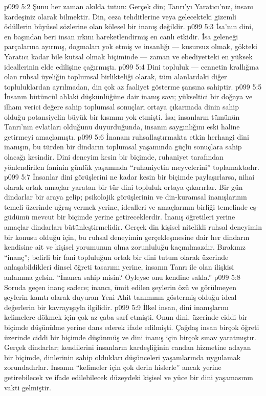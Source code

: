 \vs p099 5:2 Şunu her zaman akılda tutun: Gerçek din; Tanrı’yı Yaratıcı’nız, insanı kardeşiniz olarak bilmektir. Din, ceza tehditlerine veya gelecekteki gizemli ödüllerin büyüsel sözlerine olan kölesel bir inanış değildir.
\vs p099 5:3 İsa’nın dini, en başından beri insan ırkını hareketlendirmiş en canlı etkidir. İsa geleneği parçalarına ayırmış, dogmaları yok etmiş ve insanlığı --- kusursuz olmak, gökteki Yaratıcı kadar bile kutsal olmak biçiminde --- zaman ve ebediyetteki en yüksek ideallerinin elde edilişine çağırmıştı.
\vs p099 5:4 Dini topluluk --- cennetin krallığına olan ruhsal üyeliğin toplumsal birlikteliği olarak, tüm alanlardaki diğer topluluklardan ayrılmadan, din çok az faaliyet gösterme şansına sahiptir.
\vs p099 5:5 İnsanın bütüncül ahlaki düşkünlüğüne dair inanış savı; yükseltici bir doğaya ve ilham verici değere sahip toplumsal sonuçları ortaya çıkarmada dinin sahip olduğu potansiyelin büyük bir kısmını yok etmişti. İsa; insanların tümünün Tanrı’nın evlatları olduğunu duyurduğunda, insanın saygınlığını eski haline getirmeyi amaçlamıştı.
\vs p099 5:6 İnananı ruhsallaştırmakta etkin herhangi dini inanışın, bu türden bir dindarın toplumsal yaşamında güçlü sonuçlara sahip olacağı kesindir. Dini deneyim kesin bir biçimde, ruhaniyet tarafından yönlendirilen faninin günlük yaşamında “ruhaniyetin meyvelerini” toplamaktadır.
\vs p099 5:7 İnsanlar dini görüşlerini ne kadar kesin bir biçimde paylaşırlarsa, nihai olarak ortak amaçlar yaratan bir tür dini topluluk ortaya çıkarırlar. Bir gün dindarlar bir araya gelip; psikolojik görüşlerinin ve din\hyp{}kuramsal inanışlarının temeli üzerinde uğraş vermek yerine, idealleri ve amaçlarının birliği temelinde eş\hyp{}güdümü mevcut bir biçimde yerine getireceklerdir. İnanış öğretileri yerine amaçlar dindarları bütünleştirmelidir. Gerçek din kişisel nitelikli ruhsal deneyimin bir konusu olduğu için, bu ruhsal deneyimin gerçekleşmesine dair her dindarın kendisine ait ve kişisel yorumunun olma zorunluluğu kaçınılmazdır. Bırakınız “inanç”; belirli bir fani topluluğun ortak bir dini tutum olarak üzerinde anlaşabildikleri dinsel öğreti tasarımı yerine, insanın Tanrı ile olan ilişkisi anlamına gelsin. “İnanca sahip misin? Öyleyse onu kendine sakla.”
\vs p099 5:8 Soruda geçen inanç sadece; inancı, ümit edilen şeylerin özü ve görülmeyen şeylerin kanıtı olarak duyuran Yeni Ahit tanımının göstermiş olduğu ideal değerlerin bir kavrayışıyla ilgilidir.
\vs p099 5:9 İlkel insan, dini inanışlarını kelimelere dökmek için çok az çaba sarf etmişti. Onun dini, üzerinde ciddi bir biçimde düşünülme yerine dans ederek ifade edilmişti. Çağdaş insan birçok öğreti üzerinde ciddi bir biçimde düşünmüş ve dini inanış için birçok sınav yaratmıştır. Gerçek dindarlar; kendilerini insanların kardeşliğinin candan hizmetine adayan bir biçimde, dinlerinin sahip oldukları düşünceleri yaşamlarında uygulamak zorundadırlar. İnsanın “kelimeler için çok derin hislerle” ancak yerine getirebilecek ve ifade edilebilecek düzeydeki kişisel ve yüce bir dini yaşamasının vakti gelmiştir.
